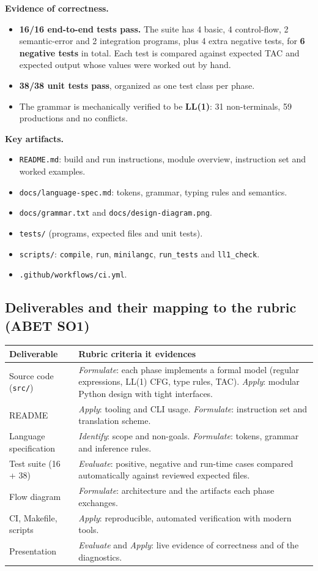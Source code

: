 \documentclass[11pt,letterpaper]{article}
\newcommand{\code}[1]{\texttt{#1}}
\begin{document}
\textbf{Evidence of correctness.}
\begin{itemize}
  \item \textbf{16/16 end-to-end tests pass.} The suite has 4 basic, 4 control-flow, 2 semantic-error and 2 integration programs, plus 4 extra negative tests, for \textbf{6 negative tests} in total. Each test is compared against expected TAC and expected output whose values were worked out by hand.
  \item \textbf{38/38 unit tests pass}, organized as one test class per phase.
  \item The grammar is mechanically verified to be \textbf{LL(1)}: 31 non-terminals, 59 productions and no conflicts.
\end{itemize}

\textbf{Key artifacts.}
\begin{itemize}
  \item \code{README.md}: build and run instructions, module overview, instruction set and worked examples.
  \item \code{docs/language-spec.md}: tokens, grammar, typing rules and semantics.
  \item \code{docs/grammar.txt} and \code{docs/design-diagram.png}.
  \item \code{tests/} (programs, expected files and unit tests).
  \item \code{scripts/}: \code{compile}, \code{run}, \code{minilangc}, \code{run\_tests} and \code{ll1\_check}.
  \item \code{.github/workflows/ci.yml}.
\end{itemize}

\subsection*{Deliverables and their mapping to the rubric (ABET SO1)}
\begin{tabularx}{\linewidth}{>{\raggedright}p{3.3cm} X}
\toprule
\textbf{Deliverable} & \textbf{Rubric criteria it evidences} \\
\midrule
Source code (\code{src/}) & \emph{Formulate}: each phase implements a formal model (regular expressions, LL(1) CFG, type rules, TAC). \emph{Apply}: modular Python design with tight interfaces. \\
README & \emph{Apply}: tooling and CLI usage. \emph{Formulate}: instruction set and translation scheme. \\
Language specification & \emph{Identify}: scope and non-goals. \emph{Formulate}: tokens, grammar and inference rules. \\
Test suite (16 + 38) & \emph{Evaluate}: positive, negative and run-time cases compared automatically against reviewed expected files. \\
Flow diagram & \emph{Formulate}: architecture and the artifacts each phase exchanges. \\
CI, Makefile, scripts & \emph{Apply}: reproducible, automated verification with modern tools. \\
Presentation & \emph{Evaluate} and \emph{Apply}: live evidence of correctness and of the diagnostics. \\
\bottomrule
\end{tabularx}
\end{document}
